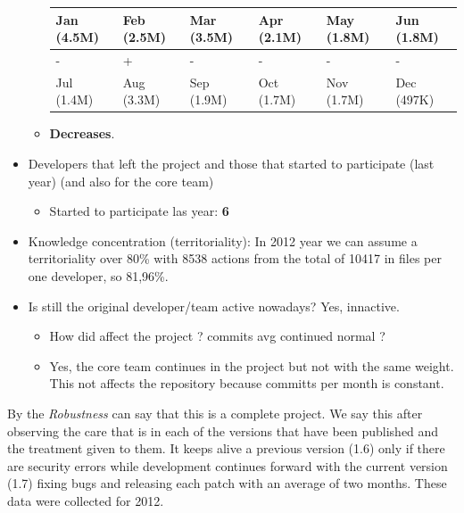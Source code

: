 \documentclass[11pt]{scrartcl}
\begin{document}
\begin{itemize}
\begin{itemize}
            \begin{tabular}{|l|l|l|l|l|l|}
                \hline
        	    Jan (4.5M) & Feb (2.5M) & Mar (3.5M) & Apr (2.1M) & May (1.8M) & Jun (1.8M)\\
        	    \hline
        	    - & + & - & - & - & -\\
                \hline
                Jul (1.4M) & Aug (3.3M) & Sep (1.9M) & Oct (1.7M) & Nov (1.7M) & Dec (497K)\\
                \hline
            \end{tabular}
        \item \textbf{Decreases}.
    \end{itemize}
    \item Developers that left the project and those that started to participate (last year) (and also for the core team)
    \begin{itemize}
        \item Started to participate las year: \textbf{6}
    \end{itemize}
	    \item Knowledge concentration (territoriality): In 2012 year we can assume a territoriality over 80\% with 8538 actions from the total of 10417 in files per one developer, so 81,96\%.
    \item Is still the original developer/team active nowadays? Yes, innactive.
    \begin{itemize}
        \item How did affect the project ? commits avg continued normal ?
        \item Yes, the core team continues in the project but not with the same weight. This not affects the repository because committs per month is constant.
    \end{itemize}
\end{itemize}

\par By the \emph{Robustness} can say that this is a complete project. We say this after observing the care that is in each of the versions that have been published and the treatment given to them. It keeps alive a previous version (1.6) only if there are security errors while development continues forward with the current version (1.7) fixing bugs and releasing each patch with an average of two months. These data were collected for 2012.
\end{document}
